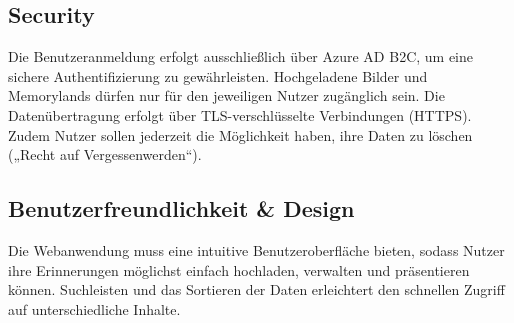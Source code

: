 \subsection{Security}

Die Benutzeranmeldung erfolgt ausschließlich über Azure AD B2C, um eine sichere 
Authentifizierung zu gewährleisten. Hochgeladene Bilder und Memorylands dürfen nur 
für den jeweiligen Nutzer zugänglich sein. Die Datenübertragung erfolgt über 
TLS-verschlüsselte Verbindungen (HTTPS). Zudem Nutzer sollen jederzeit die Möglichkeit
haben, ihre Daten zu löschen („Recht auf Vergessenwerden“).

\subsection{Benutzerfreundlichkeit \& Design}

Die Webanwendung muss eine intuitive Benutzeroberfläche bieten, sodass Nutzer ihre 
Erinnerungen möglichst einfach hochladen, verwalten und präsentieren können. 
Suchleisten und das Sortieren der Daten erleichtert den schnellen Zugriff auf 
unterschiedliche Inhalte.
